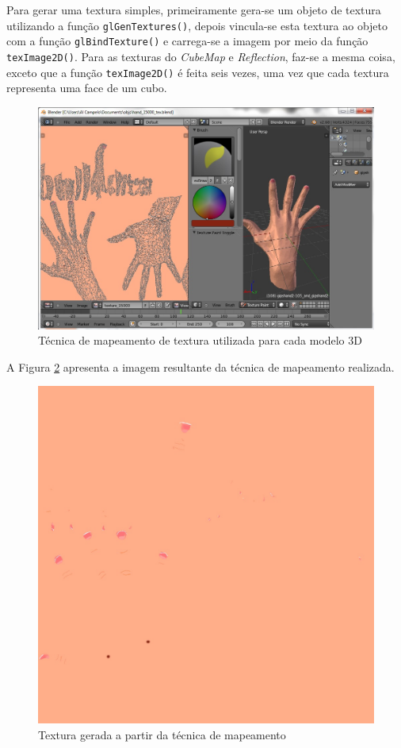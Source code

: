 	Para gerar uma textura simples, primeiramente gera-se um objeto de textura utilizando a função \texttt{glGenTextures()}, depois vincula-se esta textura ao objeto com a função \texttt{glBindTexture()} e carrega-se a imagem por meio da função \texttt{texImage2D()}.  Para as texturas do \textit{CubeMap} e \textit{Reflection}, faz-se a mesma coisa, exceto que a função \texttt{texImage2D()} é feita seis vezes, uma vez que cada textura representa uma face de um cubo. 

	\begin{figure}[ht]
	\centering
		\includegraphics[keepaspectratio=true,scale=0.6]{figuras/uvmap.jpg}
	\caption{Técnica de mapeamento de textura utilizada para cada modelo 3D}
	\label{uvmap}
	\end{figure}

	A Figura  \ref{texture_uvmap} apresenta a imagem resultante da técnica de mapeamento realizada.

	\begin{figure}[ht]
	\centering
		\includegraphics[keepaspectratio=true,scale=0.2]{figuras/texture_uvmap.jpg}
	\caption{Textura gerada a partir da técnica de mapeamento}
	\label{texture_uvmap}
	\end{figure}

